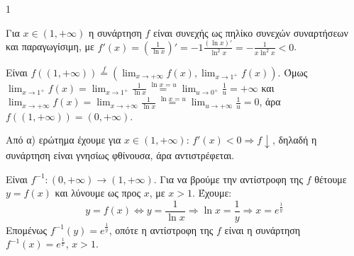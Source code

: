 \begin{ylh}{1}
    \item [Συνέχεια, Παραγώγιση, Μονοτονία, Όρια, Αντίστροφη Συνάρτηση]
\end{ylh}
\begin{alist}
    \item[α)]
    \begin{rlist}
        \item Για $x \in (1,+\infty)$ η συνάρτηση $f$ είναι συνεχής ως πηλίκο συνεχών συναρτήσεων και παραγωγίσιμη, με $f'(x)=\left(\frac{1}{\ln x}\right)' = -1 \frac{(\ln x)'}{\ln^2 x} = -\frac{1}{x \ln^2 x} < 0$.
        \item Είναι $f((1,+\infty)) \stackrel{f}{=} \left(\lim_{x \to +\infty} f(x), \lim_{x \to 1^+} f(x)\right)$. Όμως
        $\lim_{x \to 1^+} f(x) = \lim_{x \to 1^+} \frac{1}{\ln x} \stackrel{\ln x = u}{=} \lim_{u \to 0^+} \frac{1}{u} = +\infty$ και $\lim_{x \to +\infty} f(x) = \lim_{x \to +\infty} \frac{1}{\ln x} \stackrel{\ln x = u}{=} \lim_{u \to +\infty} \frac{1}{u} = 0$, άρα
        $f((1,+\infty)) = (0,+\infty)$.
    \end{rlist}
    \item[β)]
    \begin{rlist}
        \item Από α) ερώτημα έχουμε για $x \in (1,+\infty)$: $f'(x)<0 \Rightarrow f \downarrow$, δηλαδή η συνάρτηση είναι γνησίως φθίνουσα, άρα αντιστρέφεται.
        \item Είναι $f^{-1} : (0,+\infty) \to (1,+\infty)$.
        Για να βρούμε την αντίστροφη της $f$ θέτουμε $y = f(x)$ και λύνουμε ως προς $x$, με $x>1$. Έχουμε:
        \[ y = f(x) \Leftrightarrow y = \frac{1}{\ln x} \Rightarrow \ln x = \frac{1}{y} \Rightarrow x = e^{\frac{1}{y}} \]
        Επομένως $f^{-1}(y) = e^{\frac{1}{y}}$, οπότε η αντίστροφη της $f$ είναι η συνάρτηση
        $f^{-1}(x) = e^{\frac{1}{x}}$, $x>1$.
    \end{rlist}
\end{alist}
